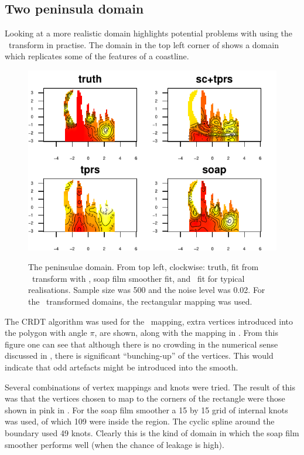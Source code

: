 \subsection{Two peninsula domain}
\label{sc-penin}

Looking at a more realistic domain highlights potential problems with using the \sch\ transform in practise. The domain in the top left corner of  shows a domain which replicates some of the features of a coastline.

\begin{figure}
\centering
\includegraphics[width=6in]{sc/figs/wigglytop2-real.pdf} \\
\caption{The peninsulae domain. From top left, clockwise: truth, fit from \sch\ transform with \tprs, soap film smoother fit, and \tprs\ fit for typical realisations. Sample size was 500 and the noise level was 0.02. For the \sch\ transformed domains, the rectangular mapping was used.}
\label{sc-wigglytop2-real}
\end{figure}

The CRDT algorithm was used for the \sch\ mapping, extra vertices introduced into the polygon with angle $\pi$, are shown, along with the mapping in . From this figure one can see that although there is no crowding in the numerical sense discussed in , there is significant ``bunching-up'' of the vertices. This would indicate that odd artefacts might be introduced into the smooth.

Several combinations of vertex mappings and knots were tried. The result of this was that the vertices chosen to map to the corners of the rectangle were those shown in pink in . For the soap film smoother a 15 by 15 grid of internal knots was used, of which 109 were inside the region. The cyclic spline around the boundary used 49 knots. Clearly this is the kind of domain in which the soap film smoother performs well (when the chance of leakage is high).

